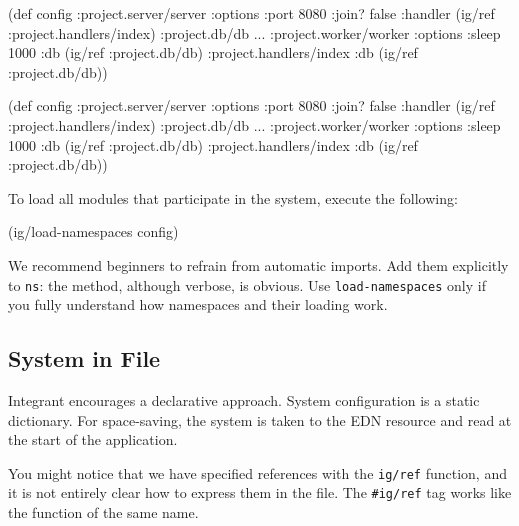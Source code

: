\ifnarrow

\begin{english}
  \begin{clojure}
(def config
  {:project.server/server
   {:options {:port 8080 :join? false}
    :handler (ig/ref
               :project.handlers/index)}
   :project.db/db {...}
   :project.worker/worker
   {:options {:sleep 1000}
    :db      (ig/ref :project.db/db)}
   :project.handlers/index
   {:db (ig/ref :project.db/db)}})
  \end{clojure}
\end{english}

\else

\begin{english}
  \begin{clojure}
(def config
  {:project.server/server
   {:options {:port 8080 :join? false}
    :handler (ig/ref :project.handlers/index)}
   :project.db/db {...}
   :project.worker/worker
   {:options {:sleep 1000}
    :db      (ig/ref :project.db/db)}
   :project.handlers/index
   {:db (ig/ref :project.db/db)}})
  \end{clojure}
\end{english}

\fi

\noindent
To load all modules that participate in the system, execute the following:

\begin{english}
  \begin{clojure}
(ig/load-namespaces config)
  \end{clojure}
\end{english}

We recommend beginners to refrain from automatic imports. Add them explicitly to \verb|ns|: the method, although verbose, is obvious. Use \verb|load-namespaces| only if you fully understand how namespaces and their loading work.

\subsection{System in File}


Integrant encourages a declarative approach. System configuration is a static dictionary. For space-saving, the system is taken to the EDN resource and read at the start of the application.


You might notice that we have specified references with the \verb|ig/ref| function, and it is not entirely clear how to express them in the file. The \verb|#ig/ref| tag works like the function of the same name.

